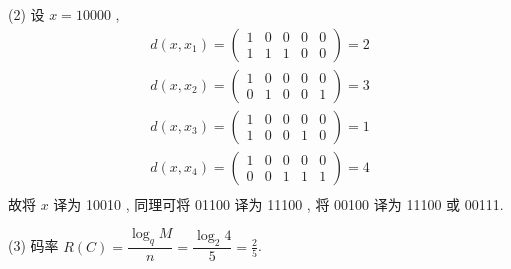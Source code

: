 \begin{solution}
 (2) 设 $x=10000$ ,
$$
\begin{array}{l}
d\left(x, x_{1}\right)=\left(\begin{array}{lllll}
1 & 0 & 0 & 0 & 0 \\
1 & 1 & 1 & 0 & 0
\end{array}\right)=2 \\
d\left(x, x_{2}\right)=\left(\begin{array}{lllll}
1 & 0 & 0 & 0 & 0 \\
0 & 1 & 0 & 0 & 1
\end{array}\right)=3 \\
d\left(x, x_{3}\right)=\left(\begin{array}{lllll}
1 & 0 & 0 & 0 & 0 \\
1 & 0 & 0 & 1 & 0
\end{array}\right)=1 \\
d\left(x, x_{4}\right)=\left(\begin{array}{lllll}
1 & 0 & 0 & 0 & 0 \\
0 & 0 & 1 & 1 & 1
\end{array}\right)=4 \\
\end{array}
$$
故将 $ x $ 译为 10010 , 同理可将 01100 译为 11100 , 将 00100 译为 11100 或 00111.

(3) 码率 $ R(C)=\dfrac{\log _{q} M}{n}=\dfrac{\log _{2} 4}{5}=\frac{2}{5} $.
\end{solution}


